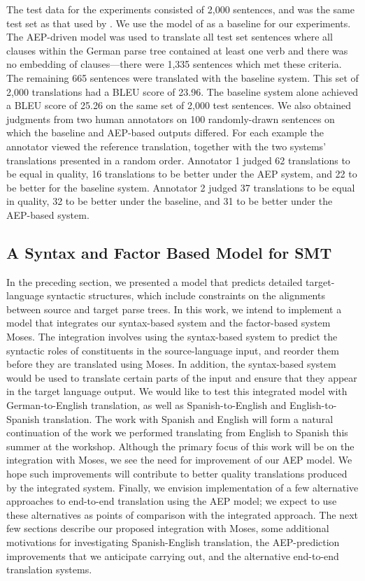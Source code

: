 \documentclass[10pt]{report}
\theoremstyle{plain}
\begin{document}
{The test data for the experiments consisted of 2,000 sentences, and
was the same test set as that used by . We use the model of  as a baseline for our experiments. The
AEP-driven model was used to translate all test set sentences where
all clauses within the German parse tree contained at least one verb
and there was no embedding of clauses---there were 1,335 sentences
which met these criteria. The remaining 665 sentences were translated
with the baseline system. This set of 2,000 translations had a BLEU
score  of 23.96. The baseline system alone achieved a
BLEU score of 25.26 on the same set of 2,000 test sentences. We also
obtained judgments from two human annotators on 100 randomly-drawn
sentences on which the baseline and AEP-based outputs differed.  For
each example the annotator viewed the reference translation, together
with the two systems' translations presented in a random order.
Annotator 1 judged 62 translations to be equal in quality, 16
translations to be better under the AEP system, and 22 to be better
for the baseline system. Annotator 2 judged 37 translations to be
equal in quality, 32 to be better under the baseline, and 31 to be
better under the AEP-based system.

\subsection{A Syntax and Factor Based Model for SMT}
\label{future}
In the preceding section, we presented a model that predicts detailed
target-language syntactic structures, which include constraints on the
alignments between source and target parse trees. In this work, we
intend to implement a model that integrates our syntax-based system
and the factor-based system Moses. The integration involves using the
syntax-based system to predict the syntactic roles of constituents in
the source-language input, and reorder them before they are translated
using Moses. In addition, the syntax-based system would be used to
translate certain parts of the input and ensure that they appear in
the target language output. We would like to test this integrated
model with German-to-English translation, as well as
Spanish-to-English and English-to-Spanish translation. The work with
Spanish and English will form a natural continuation of the work we
performed translating from English to Spanish this summer at the
workshop. Although the primary focus of this work will be on the
integration with Moses, we see the need for improvement of our AEP
model. We hope such improvements will contribute to better quality
translations produced by the integrated system. Finally, we envision
implementation of a few alternative approaches to end-to-end
translation using the AEP model; we expect to use these alternatives
as points of comparison with the integrated approach. The next few
sections describe our proposed integration with Moses, some additional
motivations for investigating Spanish-English translation, the
AEP-prediction improvements that we anticipate carrying out, and the
alternative end-to-end translation systems.

}
\end{document}
